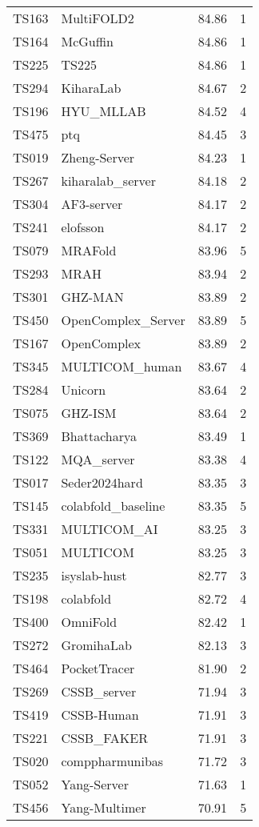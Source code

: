 \begin{table}[ht]
{\begin{tabular}{llrr}
TS163 & MultiFOLD2 & 84.86 & 1 \\ 
TS164 & McGuffin & 84.86 & 1 \\ 
TS225 & TS225 & 84.86 & 1 \\ 
TS294 & KiharaLab & 84.67 & 2 \\ 
TS196 & HYU\_MLLAB & 84.52 & 4 \\ 
TS475 & ptq & 84.45 & 3 \\ 
TS019 & Zheng-Server & 84.23 & 1 \\ 
TS267 & kiharalab\_server & 84.18 & 2 \\ 
TS304 & AF3-server & 84.17 & 2 \\ 
TS241 & elofsson & 84.17 & 2 \\ 
TS079 & MRAFold & 83.96 & 5 \\ 
TS293 & MRAH & 83.94 & 2 \\ 
TS301 & GHZ-MAN & 83.89 & 2 \\ 
TS450 & OpenComplex\_Server & 83.89 & 5 \\ 
TS167 & OpenComplex & 83.89 & 2 \\ 
TS345 & MULTICOM\_human & 83.67 & 4 \\ 
TS284 & Unicorn & 83.64 & 2 \\ 
TS075 & GHZ-ISM & 83.64 & 2 \\ 
TS369 & Bhattacharya & 83.49 & 1 \\ 
TS122 & MQA\_server & 83.38 & 4 \\ 
TS017 & Seder2024hard & 83.35 & 3 \\ 
TS145 & colabfold\_baseline & 83.35 & 5 \\ 
TS331 & MULTICOM\_AI & 83.25 & 3 \\ 
TS051 & MULTICOM & 83.25 & 3 \\ 
TS235 & isyslab-hust & 82.77 & 3 \\ 
TS198 & colabfold & 82.72 & 4 \\ 
TS400 & OmniFold & 82.42 & 1 \\ 
TS272 & GromihaLab & 82.13 & 3 \\ 
TS464 & PocketTracer & 81.90 & 2 \\ 
TS269 & CSSB\_server & 71.94 & 3 \\ 
TS419 & CSSB-Human & 71.91 & 3 \\ 
TS221 & CSSB\_FAKER & 71.91 & 3 \\ 
TS020 & comppharmunibas & 71.72 & 3 \\ 
TS052 & Yang-Server & 71.63 & 1 \\ 
TS456 & Yang-Multimer & 70.91 & 5 \\ 

\end{tabular}}
\end{table}
